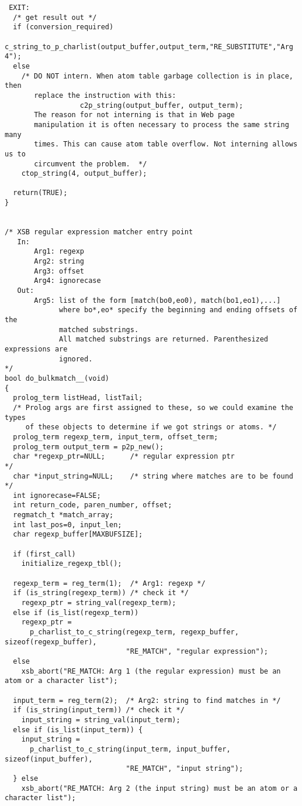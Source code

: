 \begin{verbatim}
 EXIT:
  /* get result out */
  if (conversion_required)
    c_string_to_p_charlist(output_buffer,output_term,"RE_SUBSTITUTE","Arg 4");
  else
    /* DO NOT intern. When atom table garbage collection is in place, then
       replace the instruction with this:
                  c2p_string(output_buffer, output_term);
       The reason for not interning is that in Web page
       manipulation it is often necessary to process the same string many
       times. This can cause atom table overflow. Not interning allows us to
       circumvent the problem.  */
    ctop_string(4, output_buffer);
  
  return(TRUE);
}


/* XSB regular expression matcher entry point
   In:
       Arg1: regexp
       Arg2: string
       Arg3: offset
       Arg4: ignorecase
   Out:
       Arg5: list of the form [match(bo0,eo0), match(bo1,eo1),...]
             where bo*,eo* specify the beginning and ending offsets of the
             matched substrings.
             All matched substrings are returned. Parenthesized expressions are
             ignored.
*/
bool do_bulkmatch__(void)
{
  prolog_term listHead, listTail;
  /* Prolog args are first assigned to these, so we could examine the types
     of these objects to determine if we got strings or atoms. */
  prolog_term regexp_term, input_term, offset_term;
  prolog_term output_term = p2p_new();
  char *regexp_ptr=NULL;      /* regular expression ptr               */
  char *input_string=NULL;    /* string where matches are to be found */
  int ignorecase=FALSE;
  int return_code, paren_number, offset;
  regmatch_t *match_array;
  int last_pos=0, input_len;
  char regexp_buffer[MAXBUFSIZE];

  if (first_call)
    initialize_regexp_tbl();

  regexp_term = reg_term(1);  /* Arg1: regexp */
  if (is_string(regexp_term)) /* check it */
    regexp_ptr = string_val(regexp_term);
  else if (is_list(regexp_term))
    regexp_ptr =
      p_charlist_to_c_string(regexp_term, regexp_buffer, sizeof(regexp_buffer),
                             "RE_MATCH", "regular expression");
  else
    xsb_abort("RE_MATCH: Arg 1 (the regular expression) must be an atom or a character list");

  input_term = reg_term(2);  /* Arg2: string to find matches in */
  if (is_string(input_term)) /* check it */
    input_string = string_val(input_term);
  else if (is_list(input_term)) {
    input_string =
      p_charlist_to_c_string(input_term, input_buffer, sizeof(input_buffer),
                             "RE_MATCH", "input string");
  } else
    xsb_abort("RE_MATCH: Arg 2 (the input string) must be an atom or a character list");


\end{verbatim}
